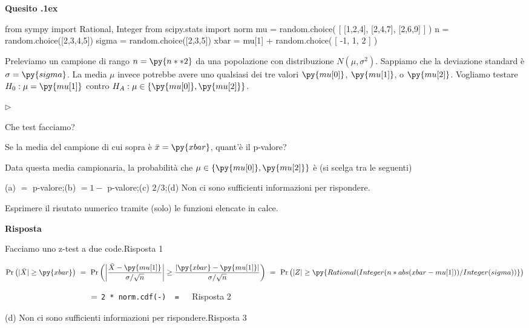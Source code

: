 \documentclass[11pt,twoside,a4paper]{article}
\newcommand{\mylabel}[1]{#1\hfill}
\renewenvironment{itemize}
  {\begin{list}{$\triangleright$}{%
   \setlength{\parskip}{0mm}
   \setlength{\topsep}{.4\baselineskip}
   \setlength{\rightmargin}{0mm}
   \setlength{\listparindent}{0mm}
   \setlength{\itemindent}{0mm}
   \setlength{\labelwidth}{2ex}
   \setlength{\itemsep}{.4\baselineskip}
   \setlength{\parsep}{0mm}
   \setlength{\partopsep}{0mm}
   \setlength{\labelsep}{1ex}
   \setlength{\leftmargin}{\labelwidth+\labelsep}
   \let\makelabel\mylabel}}{%
   \end{list}\vspace*{-1.3mm}}
\def\Pr{{\rm Pr\,}}
\newcounter{quesito}
\newenvironment{question}{\bigskip\addtocounter{quesito}{1}\par\textbf{Quesito \thequesito.\kern1ex}}{\vspace{\parskip}}
\newenvironment{answer}{\par\textbf{Risposta\quad}}{\vspace{\parskip}}
\begin{document}
\begin{question} %
\begin{pycode}
from sympy import Rational, Integer
from scipy.stats import norm
mu = random.choice( [ [1,2,4], [2,4,7], [2,6,9] ] ) 
n = random.choice([2,3,4,5])
sigma = random.choice([2,3,5])
xbar = mu[1] + random.choice( [ -1, 1, 2 ] ) 
\end{pycode}
Preleviamo un campione di rango $n=\py{n**2}$ da una popolazione con distribuzione $N(\mu,\sigma^2)$. Sappiamo che la deviazione standard è $\sigma=\py{sigma}$. La media $\mu$ invece potrebbe avere uno qualsiasi dei tre valori $\py{mu[0]}$, $\py{mu[1]}$, o $\py{mu[2]}$. 
Vogliamo testare $H_0:\mu=\py{mu[1]}$ contro $H_A:\mu\in\{\py{mu[0]},\py{mu[2]}\}$.
\begin{itemize}
\item[1.] Che test facciamo?
\item[2.] Se la media del campione di cui sopra è $\bar x=\py{xbar}$, quant'è il p-valore?
\item[3.] Data questa media campionaria, la probabilità che $\mu\in\{\py{mu[0]},\py{mu[2]}\}$ è (si scelga tra le seguenti)\medskip

(a) $=$ p-valore;\hfill (b) $=1-$ p-valore;\hfill (c) $2/3$;\hfill (d) Non ci sono sufficienti informazioni per rispondere.
\end{itemize}

Esprimere il risutato numerico tramite (solo) le funzioni elencate in calce.
\begin{answer}

{\color{blue}Facciamo uno z-test a due code.\hfill Risposta 1}

$\Pr\big(|\bar X|\ge\py{xbar}\big)\ =\ \Pr\bigg(\bigg|\dfrac{\bar X-\py{mu[1]}}{\sigma/\sqrt{n}}\bigg|\ge\dfrac{|\py{xbar}-\py{mu[1]}| }{\sigma/\sqrt{n} }\bigg)\ =\ \Pr\big(|Z|\ge\py{Rational(Integer(n*abs(xbar-mu[1]) ) / Integer(sigma) ) }\big)$

$\phantom{\Pr\big(|\bar X|\ge\py{xbar}\big)}\ =\ ${\color{blue}\tt 2 * norm.cdf(-) }{\tt\ =  \  }{\color{blue}\hfill Risposta 2}

\medskip
{\color{blue}(d) Non ci sono sufficienti informazioni per rispondere.\hfill Risposta 3}

\end{answer}
\end{question}
\end{document}
